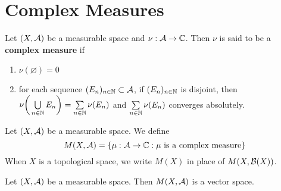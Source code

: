 \documentclass{book}
\begin{document}
	
	
	
	
	
	
	
	
	\newpage	
	\section{Complex Measures}
	
	\begin{defn}  
		Let $(X, \mathcal{A})$ be a measurable space and $\nu:\mathcal{A} \rightarrow \mathbb{C}$. Then $\nu$ is said to be a \textbf{complex measure} if 
		\begin{enumerate}
			\item $\nu (\varnothing) = 0$
			\item for each sequence $(E_n)_{n \in \mathbb{N}} \subset \mathcal{A}$, if $(E_n)_{n \in \mathbb{N}}$ is disjoint, then $\nu \bigg( \bigcup\limits_{n \in \mathbb{N}} E_n \bigg) = \sum\limits_{n \in \mathbb{N}} \nu(E_n)$ and $\sum\limits_{n \in \mathbb{N}} \nu(E_n)$ converges absolutely. 
		\end{enumerate}
	\end{defn}
	
	\begin{defn}  
	Let $(X, \mathcal{A})$ be a measurable space. We define 
	$$M(X, \mathcal{A}) = \{\mu:\mathcal{A} \rightarrow \mathbb{C}: \mu \text{ is a complex measure}\}$$
	When $X$ is a topological space, we write $M(X)$ in place of $M(X, \mathcal{B}(X))$.
	\end{defn}

	\begin{ex}  
		Let $(X, \mathcal{A})$ be a measurable space. Then $M(X, \mathcal{A})$ is a vector space.
	\end{ex}
\end{document}
